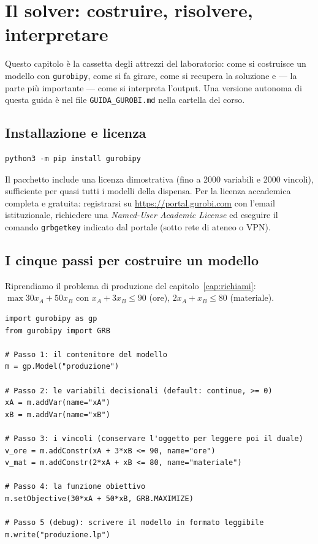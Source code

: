 \chapter{Il solver: costruire, risolvere, interpretare}
\label{cap:pythongurobi}

Questo capitolo è la cassetta degli attrezzi del laboratorio: come si costruisce un
modello con \texttt{gurobipy}, come si fa girare, come si recupera la soluzione e ---
la parte più importante --- come si interpreta l'output. Una versione autonoma di
questa guida è nel file \texttt{GUIDA\_GUROBI.md} nella cartella del corso.

\section{Installazione e licenza}

\begin{lstlisting}[style=output]
python3 -m pip install gurobipy
\end{lstlisting}

Il pacchetto include una licenza dimostrativa (fino a 2000 variabili e 2000 vincoli),
sufficiente per quasi tutti i modelli della dispensa. Per la licenza accademica completa
e gratuita: registrarsi su \url{https://portal.gurobi.com} con l'email istituzionale,
richiedere una \emph{Named-User Academic License} ed eseguire il comando
\texttt{grbgetkey} indicato dal portale (sotto rete di ateneo o VPN).

\section{I cinque passi per costruire un modello}

Riprendiamo il problema di produzione del capitolo~\ref{cap:richiami}:
$\max 30x_A + 50x_B$ con $x_A + 3x_B \le 90$ (ore), $2x_A + x_B \le 80$ (materiale).

\begin{lstlisting}[style=python]
import gurobipy as gp
from gurobipy import GRB

# Passo 1: il contenitore del modello
m = gp.Model("produzione")

# Passo 2: le variabili decisionali (default: continue, >= 0)
xA = m.addVar(name="xA")
xB = m.addVar(name="xB")

# Passo 3: i vincoli (conservare l'oggetto per leggere poi il duale)
v_ore = m.addConstr(xA + 3*xB <= 90, name="ore")
v_mat = m.addConstr(2*xA + xB <= 80, name="materiale")

# Passo 4: la funzione obiettivo
m.setObjective(30*xA + 50*xB, GRB.MAXIMIZE)

# Passo 5 (debug): scrivere il modello in formato leggibile
m.write("produzione.lp")
\end{lstlisting}

